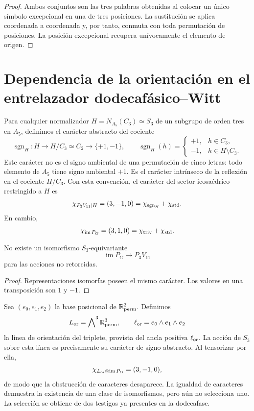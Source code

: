 \begin{proof}
Ambos conjuntos son las tres palabras obtenidas al colocar un único símbolo
excepcional en una de tres posiciones. La sustitución se aplica coordenada a
coordenada y, por tanto, conmuta con toda permutación de posiciones. La
posición excepcional recupera unívocamente el elemento de origen.
\end{proof}

\section{Dependencia de la orientación en el entrelazador dodecafásico--Witt}

Para cualquier normalizador \(H=N_{A_5}(C_3)\simeq S_3\) de un subgrupo de
orden tres en \(A_5\), definimos el carácter abstracto del cociente
\[
 \operatorname{sgn}_H:H\longrightarrow H/C_3\simeq C_2
 \longrightarrow\{+1,-1\},
 \qquad
 \operatorname{sgn}_H(h)=
 \begin{cases}
 +1,&h\in C_3,\\
 -1,&h\in H\setminus C_3.
 \end{cases}
\]
Este carácter no es el signo ambiental de una permutación de cinco letras:
todo elemento de \(A_5\) tiene signo ambiental \(+1\). Es el carácter
intrínseco de la reflexión en el cociente \(H/C_3\). Con esta convención, el
carácter del sector icosaédrico restringido a \(H\) es
\[
 \chi_{P_3V_{11}|H}=(3,-1,0)
 =\chi_{\operatorname{sgn}_H}+\chi_{\rm std}.
\]
En cambio,
\[
 \chi_{\operatorname{im}P_G}=(3,1,0)
 =\chi_{\rm triv}+\chi_{\rm std}.
\]

\begin{corollary}
\label{cor:obstruccion-entrelazador-incidencia-p3}
No existe un isomorfismo \(S_3\)-equivariante
\[
 \operatorname{im}P_G\longrightarrow P_3V_{11}
\]
para las acciones no retorcidas.
\end{corollary}

\begin{proof}
Representaciones isomorfas poseen el mismo carácter. Los valores en una
transposición son \(1\) y \(-1\).
\end{proof}

Sea \((e_0,e_1,e_2)\) la base posicional de
\(\mathbb R^3_{\rm perm}\). Definimos
\[
 L_{\rm or}
 =\bigwedge\nolimits^3\mathbb R^3_{\rm perm},
 \qquad
 \ell_{\rm or}=e_0\wedge e_1\wedge e_2
\]
la línea de orientación del triplete, provista del ancla positiva
\(\ell_{\rm or}\). La acción de \(S_3\) sobre esta línea es precisamente su
carácter de signo abstracto. Al tensorizar por ella,
\[
 \chi_{L_{\rm or}\otimes\operatorname{im}P_G}
 =(3,-1,0),
\]
de modo que la obstrucción de caracteres desaparece. La igualdad de
caracteres demuestra la existencia de una clase de isomorfismos, pero aún no
selecciona uno. La selección se obtiene de dos testigos ya presentes en la
dodecafase.

